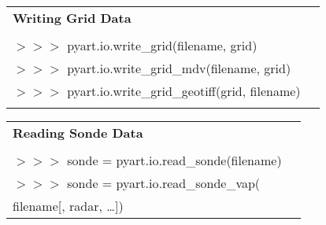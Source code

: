 \documentclass[potrait,a0paper,fontscale=0.33]{baposter} %
\begin{document}
\begin{poster}
{\begin{flushleft}
\begin{tabular}{@{}ll@{}}
\multicolumn{2}{l}{\cellcolor[HTML]{DDFFFF}\bf Writing Grid Data} \\
\\
$>$$>$$>$ pyart.io.write\_grid(filename, grid)\\
$>$$>$$>$ pyart.io.write\_grid\_mdv(filename, grid)\\
$>$$>$$>$ pyart.io.write\_grid\_geotiff(grid, filename)\\
\\
\end{tabular}

\begin{tabular}{@{}ll@{}}
\multicolumn{2}{l}{\cellcolor[HTML]{DDFFFF}\bf Reading Sonde Data} \\
\\
$>$$>$$>$ sonde = pyart.io.read\_sonde(filename)\\
$>$$>$$>$ sonde = pyart.io.read\_sonde\_vap(\\
\-\hspace{1.5cm} filename[, radar, …])\\

\end{tabular}
\end{flushleft}

}



\end{poster}
\end{document}
